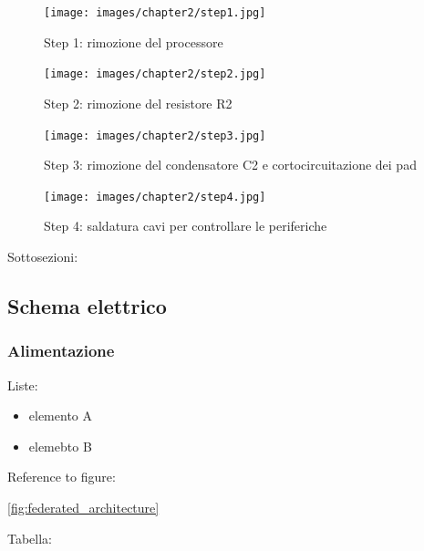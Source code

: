 \begin{figure}[H]
    \centering
    \begin{minipage}[b]{0.45\textwidth}
      \texttt{[image: images/chapter2/step1.jpg]}
      \caption{Step 1: rimozione del processore}
      \label{fig:step1}
    \end{minipage}
    \hfill
    \begin{minipage}[b]{0.45\textwidth}
      \texttt{[image: images/chapter2/step2.jpg]}
      \caption{Step 2: rimozione del resistore R2}
      \label{fig:step2}
      \end{minipage}
  \end{figure}
  
  \begin{figure}[H]
    \centering
    \begin{minipage}[b]{0.45\textwidth}
      \texttt{[image: images/chapter2/step3.jpg]}
      \caption{Step 3: rimozione del condensatore C2 e cortocircuitazione dei pad}
      \label{fig:step2}  
    \end{minipage}
    \hfill
    \begin{minipage}[b]{0.45\textwidth}
      \texttt{[image: images/chapter2/step4.jpg]}
      \caption{Step 4: saldatura cavi per controllare le periferiche}
      \label{fig:step2}
        \end{minipage}
\end{figure}

Sottosezioni:

\subsection{Schema elettrico}

\subsubsection{Alimentazione}

Liste:

\begin{itemize}
  \setlength{\itemsep}{5pt}
  \setlength{\parskip}{5pt}
  \item elemento A
  \item elemebto B
\end{itemize}


Reference to figure:

\ref{fig:federated_architecture}


Tabella:


